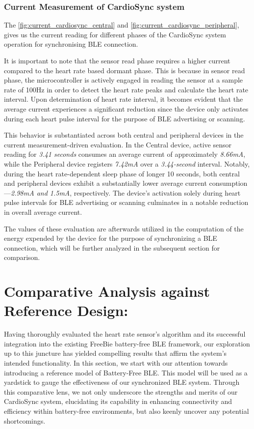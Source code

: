 \subsubsection{Current Measurement of CardioSync system}
The \autoref{fig:current_cardiosync_central} and \autoref{fig:current_cardiosync_peripheral}, gives us the current reading for different phases of the CardioSync system operation for synchronising BLE connection.

\noindent It is important to note that the sensor read phase requires a higher current compared to the heart rate based dormant phase. This is because in sensor read phase, the microcontroller is actively engaged in reading the sensor at a sample rate of 100Hz in order to detect the heart rate peaks and calculate the heart rate interval. Upon determination of heart rate interval, it becomes evident that the average current experiences a significant reduction since the device only activates during each heart pulse interval for the purpose of BLE advertising or scanning.

\noindent This behavior is substantiated across both central and peripheral devices in the current measurement-driven evaluation. In the Central device, active sensor reading for \textit{3.41 seconds} consumes an average current of approximately \textit{8.66mA}, while the Peripheral device registers \textit{7.42mA} over a \textit{3.44-second} interval. Notably, during the heart rate-dependent sleep phase of longer 10 seconds, both central and peripheral devices exhibit a substantially lower average current consumption—\textit{2.98mA and 1.5mA}, respectively. The device's activation solely during heart pulse intervals for BLE advertising or scanning culminates in a notable reduction in overall average current.

\noindent The values of these evaluation are afterwards utilized in the computation of the energy expended by the device for the purpose of synchronizing a BLE connection, which will be further analyzed in the subsequent section for comparison.

\section{Comparative Analysis against Reference Design:}
Having thoroughly evaluated the heart rate sensor's algorithm and its successful integration into the existing FreeBie battery-free BLE framework, our exploration up to this juncture has yielded compelling results that affirm the system's intended functionality. In this section, we start with our attention towards introducing a reference model of Battery-Free BLE. This model will be used as a yardstick to gauge the effectiveness of our synchronized BLE system. Through this comparative lens, we not only underscore the strengths and merits of our CardioSync system, elucidating its capability in enhancing connectivity and efficiency within battery-free environments, but also keenly uncover any potential shortcomings.

